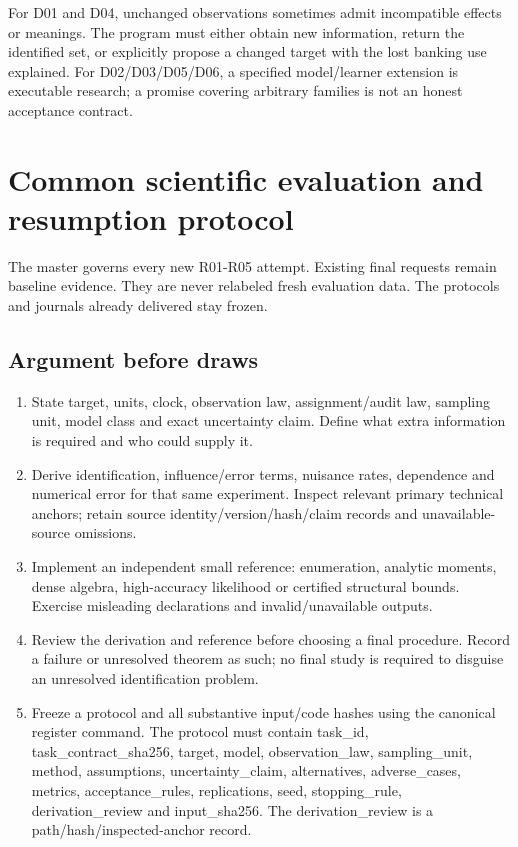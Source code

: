 \documentclass[
  11pt,
  a4paper,
]{article}
\providecommand{\tightlist}{%
  \setlength{\itemsep}{0pt}\setlength{\parskip}{0pt}}
\begin{document}
For D01 and D04, unchanged observations sometimes admit incompatible
effects or meanings. The program must either obtain new information,
return the identified set, or explicitly propose a changed target with
the lost banking use explained. For D02/D03/D05/D06, a specified
model/learner extension is executable research; a promise covering
arbitrary families is not an honest acceptance contract.

\hypertarget{common-scientific-evaluation-and-resumption-protocol}{%
\section{Common scientific evaluation and resumption
protocol}\label{common-scientific-evaluation-and-resumption-protocol}}

The master governs every new R01-R05 attempt. Existing final requests
remain baseline evidence. They are never relabeled fresh evaluation
data. The protocols and journals already delivered stay frozen.

\hypertarget{argument-before-draws}{%
\subsection{Argument before draws}\label{argument-before-draws}}

\begin{enumerate}
\def\labelenumi{\arabic{enumi}.}
\tightlist
\item
  State target, units, clock, observation law, assignment/audit law,
  sampling unit, model class and exact uncertainty claim. Define what
  extra information is required and who could supply it.
\item
  Derive identification, influence/error terms, nuisance rates,
  dependence and numerical error for that same experiment. Inspect
  relevant primary technical anchors; retain source
  identity/version/hash/claim records and unavailable-source omissions.
\item
  Implement an independent small reference: enumeration, analytic
  moments, dense algebra, high-accuracy likelihood or certified
  structural bounds. Exercise misleading declarations and
  invalid/unavailable outputs.
\item
  Review the derivation and reference before choosing a final procedure.
  Record a failure or unresolved theorem as such; no final study is
  required to disguise an unresolved identification problem.
\item
  Freeze a protocol and all substantive input/code hashes using the
  canonical register command. The protocol must contain task\_id,
  task\_contract\_sha256, target, model, observation\_law,
  sampling\_unit, method, assumptions, uncertainty\_claim, alternatives,
  adverse\_cases, metrics, acceptance\_rules, replications, seed,
  stopping\_rule, derivation\_review and input\_sha256. The
  derivation\_review is a path/hash/inspected-anchor record.
\end{enumerate}
\end{document}
